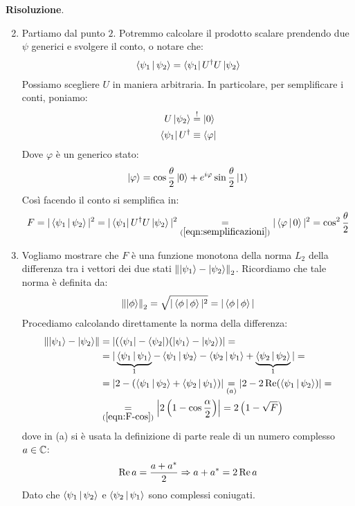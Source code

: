 \documentclass[../../InformazioneQuantistica.tex]{subfiles}
\begin{document}
\textbf{Risoluzione}.
\begin{enumerate}
\setcounter{enumi}{1}
\item Partiamo dal punto $2$. Potremmo calcolare il prodotto scalare prendendo due $\psi$ generici e svolgere il conto, o notare che:
\begin{align*}
\Braket{\psi_1|\psi_2} = \Bra{\psi_1} U^\dag U\Ket{\psi_2}
\end{align*}
Possiamo scegliere $U$ in maniera arbitraria. In particolare, per semplificare i conti, poniamo:
\begin{align}\nonumber
U\Ket{\psi_2} &\overset{!}{=}\Ket{0}\\
\Bra{\psi_1}U^\dag &\equiv \Bra{\varphi}
\label{eqn:semplificazioni}
\end{align}
Dove $\varphi$ è un generico stato:
\begin{align*}
\Ket{\varphi} = \cos\frac{\theta}{2}\Ket{0} + e^{i\varphi}\sin\frac{\theta}{2}\Ket{1}
\end{align*}
Così facendo il conto si semplifica in:
\begin{align}
\label{eqn:F-cos}
F= |\Braket{\psi_1|\psi_2}|^2 = |\Bra{\psi_1}U^\dag U\Ket{\psi_2}|^2 \underset{(\ref{eqn:semplificazioni})}{=}|\Braket{\varphi|0}|^2 = \cos^2 \frac{\theta}{2}
\end{align}
\setcounter{enumi}{0}
\item Vogliamo mostrare che $F$ è una funzione monotona della norma $L_2$ della differenza tra i vettori dei due stati $\left\lVert\Ket{\psi_1}- \Ket{\psi_2}\right\rVert_2$. Ricordiamo che tale norma è definita da:
\begin{align*}
\left\lVert\Ket{\phi}\right\rVert_2  = \sqrt{|\Braket{\phi|\phi}|^2} = |\Braket{\phi|\phi}|
\end{align*}
Procediamo calcolando direttamente la norma della differenza:
\begin{align*}
\left\lVert\Ket{\psi_1}-\Ket{\psi_2}\right\rVert &=
|(\Bra{\psi_1}-\Bra{\psi_2})(\Ket{\psi_1}-\Ket{\psi_2})|=\\
&=|\underbrace{\Braket{\psi_1|\psi_1}}_{1} - \Braket{\psi_1|\psi_2} - \Braket{\psi_2|\psi_1} + \underbrace{\Braket{\psi_2|\psi_2}}_{1}| =\\
&= |2-(\Braket{\psi_1|\psi_2}+\Braket{\psi_2|\psi_1})| \underset{(a)}{=} |2-2\operatorname{Re}(\Braket{\psi_1|\psi_2})|=\\
 &\underset{(\ref{eqn:F-cos})}{=}\left |2\left(1-\cos\frac{\alpha}{2}\right)\right| = 2\left(1-\sqrt{F}\right)
\end{align*}
dove in (a) si è usata la definizione di parte reale di un numero complesso $a \in \mathbb{C}$:
\begin{align*}
\operatorname{Re}a = \frac{a+a^*}{2} \Rightarrow a+a^* =2\operatorname{Re}a
\end{align*}
Dato che $\Braket{\psi_1|\psi_2}$ e $\Braket{\psi_2|\psi_1}$ sono complessi coniugati.

\end{enumerate}
\end{document}
